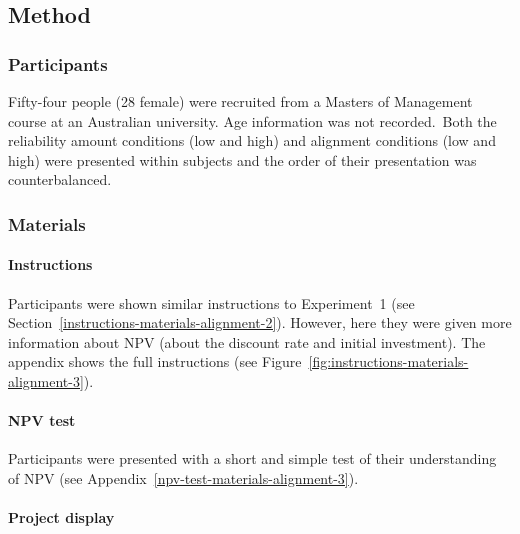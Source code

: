 \documentclass[a4paper, nobind, dvipsnames]{templates/ociamthesis}
\theoremstyle{definition}
\theoremstyle{definition}
\theoremstyle{definition}
\theoremstyle{definition}
\theoremstyle{remark}
\begin{document}
\hypertarget{method-alignment-2}{%
\subsection{Method}\label{method-alignment-2}}

\subsubsection{Participants}

Fifty-four people (28 female) were recruited from a Masters of Management course at an Australian university. Age information was not recorded.~Both the reliability amount conditions (low and
high) and alignment conditions (low and high) were presented within subjects and
the order of their presentation was counterbalanced.

\subsubsection{Materials}

\paragraph{Instructions}

Participants were shown similar instructions to Experiment~1 (see
Section~\ref{instructions-materials-alignment-2}). However, here they were
given more information about NPV (about the discount rate and initial
investment). The appendix shows the full instructions (see
Figure~\ref{fig:instructions-materials-alignment-3}).

\paragraph{NPV test}

Participants were presented with a short and simple test of their understanding
of NPV (see Appendix~\ref{npv-test-materials-alignment-3}).

\paragraph{Project display}
\end{document}
